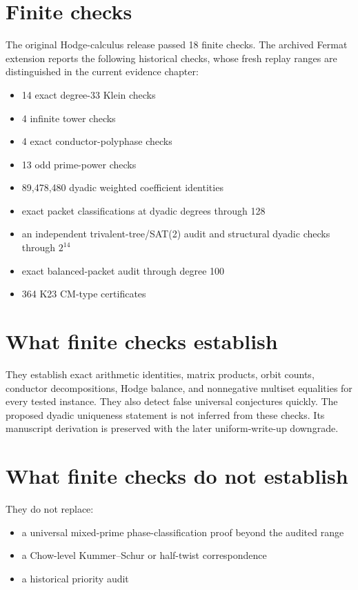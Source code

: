 \section{Finite checks}
The original Hodge-calculus release passed 18 finite checks. The archived Fermat extension reports the following historical checks, whose fresh replay ranges are distinguished in the current evidence chapter:
\begin{itemize}
\item 14 exact degree-33 Klein checks
\item 4 infinite tower checks
\item 4 exact conductor-polyphase checks
\item 13 odd prime-power checks
\item 89,478,480 dyadic weighted coefficient identities
\item exact packet classifications at dyadic degrees through 128
\item an independent trivalent-tree/SAT(2) audit and structural dyadic checks through $2^{14}$
\item exact balanced-packet audit through degree 100
\item 364 K23 CM-type certificates
\end{itemize}

\section{What finite checks establish}
They establish exact arithmetic identities, matrix products, orbit counts, conductor decompositions, Hodge balance, and nonnegative multiset equalities for every tested instance. They also detect false universal conjectures quickly. The proposed dyadic uniqueness statement is not inferred from these checks. Its manuscript derivation is preserved with the later uniform-write-up downgrade.

\section{What finite checks do not establish}
They do not replace:
\begin{itemize}
\item a universal mixed-prime phase-classification proof beyond the audited range
\item a Chow-level Kummer--Schur or half-twist correspondence
\item a historical priority audit
\end{itemize}


